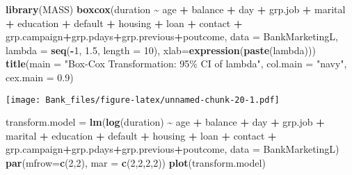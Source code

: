 \documentclass[
]{article}
\newenvironment{Shaded}{\begin{snugshade}}{\end{snugshade}}
\newcommand{\AttributeTok}[1]{\textcolor[rgb]{0.13,0.29,0.53}{#1}}
\newcommand{\DecValTok}[1]{\textcolor[rgb]{0.00,0.00,0.81}{#1}}
\newcommand{\FloatTok}[1]{\textcolor[rgb]{0.00,0.00,0.81}{#1}}
\newcommand{\FunctionTok}[1]{\textcolor[rgb]{0.13,0.29,0.53}{\textbf{#1}}}
\newcommand{\NormalTok}[1]{#1}
\newcommand{\OtherTok}[1]{\textcolor[rgb]{0.56,0.35,0.01}{#1}}
\newcommand{\SpecialCharTok}[1]{\textcolor[rgb]{0.81,0.36,0.00}{\textbf{#1}}}
\newcommand{\StringTok}[1]{\textcolor[rgb]{0.31,0.60,0.02}{#1}}
\begin{document}
\begin{Shaded}
\begin{Highlighting}[]
\FunctionTok{library}\NormalTok{(MASS)}
\FunctionTok{boxcox}\NormalTok{(duration }\SpecialCharTok{\textasciitilde{}}\NormalTok{ age }\SpecialCharTok{+}\NormalTok{ balance }\SpecialCharTok{+}\NormalTok{ day }\SpecialCharTok{+}\NormalTok{ grp.job }\SpecialCharTok{+}\NormalTok{ marital }\SpecialCharTok{+}\NormalTok{ education }\SpecialCharTok{+}\NormalTok{ default }\SpecialCharTok{+}\NormalTok{ housing }\SpecialCharTok{+}\NormalTok{ loan }\SpecialCharTok{+}\NormalTok{ contact }\SpecialCharTok{+}\NormalTok{ grp.campaign}\SpecialCharTok{+}\NormalTok{grp.pdays}\SpecialCharTok{+}\NormalTok{grp.previous}\SpecialCharTok{+}\NormalTok{poutcome, }
       \AttributeTok{data =}\NormalTok{ BankMarketingL, }
       \AttributeTok{lambda =} \FunctionTok{seq}\NormalTok{(}\SpecialCharTok{{-}}\DecValTok{1}\NormalTok{, }\FloatTok{1.5}\NormalTok{, }\AttributeTok{length =} \DecValTok{10}\NormalTok{), }
       \AttributeTok{xlab=}\FunctionTok{expression}\NormalTok{(}\FunctionTok{paste}\NormalTok{(lambda)))}
\FunctionTok{title}\NormalTok{(}\AttributeTok{main =} \StringTok{"Box{-}Cox Transformation: 95\% CI of lambda"}\NormalTok{,}
      \AttributeTok{col.main =} \StringTok{"navy"}\NormalTok{, }\AttributeTok{cex.main =} \FloatTok{0.9}\NormalTok{)}
\end{Highlighting}
\end{Shaded}

\texttt{[image: Bank\_files/figure-latex/unnamed-chunk-20-1.pdf]}

\begin{Shaded}
\begin{Highlighting}[]
\NormalTok{transform.model }\OtherTok{=} \FunctionTok{lm}\NormalTok{(}\FunctionTok{log}\NormalTok{(duration) }\SpecialCharTok{\textasciitilde{}}\NormalTok{ age }\SpecialCharTok{+}\NormalTok{ balance }\SpecialCharTok{+}\NormalTok{ day }\SpecialCharTok{+}\NormalTok{ grp.job }\SpecialCharTok{+}\NormalTok{ marital }\SpecialCharTok{+}\NormalTok{ education }\SpecialCharTok{+}\NormalTok{ default }\SpecialCharTok{+}\NormalTok{ housing }\SpecialCharTok{+}\NormalTok{ loan }\SpecialCharTok{+}\NormalTok{ contact }\SpecialCharTok{+}\NormalTok{ grp.campaign}\SpecialCharTok{+}\NormalTok{grp.pdays}\SpecialCharTok{+}\NormalTok{grp.previous}\SpecialCharTok{+}\NormalTok{poutcome, }\AttributeTok{data  =}\NormalTok{ BankMarketingL)}
\FunctionTok{par}\NormalTok{(}\AttributeTok{mfrow=}\FunctionTok{c}\NormalTok{(}\DecValTok{2}\NormalTok{,}\DecValTok{2}\NormalTok{), }\AttributeTok{mar =} \FunctionTok{c}\NormalTok{(}\DecValTok{2}\NormalTok{,}\DecValTok{2}\NormalTok{,}\DecValTok{2}\NormalTok{,}\DecValTok{2}\NormalTok{))}
\FunctionTok{plot}\NormalTok{(transform.model)}
\end{Highlighting}
\end{Shaded}
\end{document}
